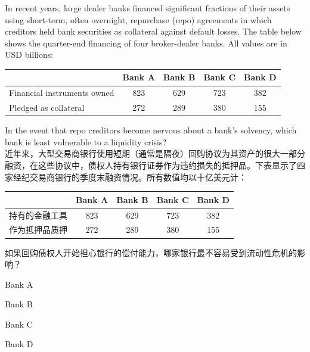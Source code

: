 \documentclass{article}
\newcounter{question} %
\begin{document}
\begin{question}
    In recent years, large dealer banks financed significant fractions of their assets using short-term, often overnight, repurchase (repo) agreements in which creditors held bank securities as collateral against default losses. The table below shows the quarter-end financing of four broker-dealer banks. All values are in USD billions:

    \begin{table}[H]
        \centering
        \begin{tabular}{lcccc}
            \hline
            & \textbf{Bank A} & \textbf{Bank B} & \textbf{Bank C} & \textbf{Bank D} \\
            \hline
            Financial instruments owned & 823 & 629 & 723 & 382 \\
            Pledged as collateral       & 272 & 289 & 380 & 155 \\
            \hline
        \end{tabular}
    \end{table}
    In the event that repo creditors become nervous about a bank's solvency, which bank is least vulnerable to a liquidity crisis?
    \\    近年来，大型交易商银行使用短期（通常是隔夜）回购协议为其资产的很大一部分融资，在这些协议中，债权人持有银行证券作为违约损失的抵押品。下表显示了四家经纪交易商银行的季度末融资情况。所有数值均以十亿美元计：

    \begin{table}[H]
        \centering
        \begin{tabular}{lcccc}
            \hline
            & \textbf{Bank A} & \textbf{Bank B} & \textbf{Bank C} & \textbf{Bank D} \\
            \hline
            持有的金融工具 & 823 & 629 & 723 & 382 \\
            作为抵押品质押       & 272 & 289 & 380 & 155 \\
            \hline
        \end{tabular}
    \end{table}
    如果回购债权人开始担心银行的偿付能力，哪家银行最不容易受到流动性危机的影响？
\end{question}

\begin{choices}
    \item Bank A
    \item Bank B
    \item Bank C
    \item Bank D
\end{choices}
\end{document}
